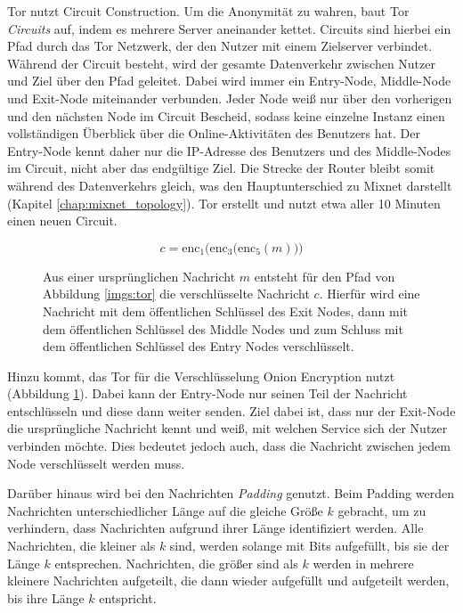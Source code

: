 Tor nutzt Circuit Construction. Um die Anonymität zu wahren, baut Tor \textit{Circuits} auf, indem es mehrere Server aneinander kettet. Circuits sind hierbei ein Pfad durch das Tor Netzwerk, der den Nutzer mit einem Zielserver verbindet. Während der Circuit besteht, wird der gesamte Datenverkehr zwischen Nutzer und Ziel über den Pfad geleitet. Dabei wird immer ein Entry-Node, Middle-Node und Exit-Node miteinander verbunden. Jeder Node weiß nur über den vorherigen und den nächsten Node im Circuit Bescheid, sodass keine einzelne Instanz einen vollständigen Überblick über die Online-Aktivitäten des Benutzers hat. Der Entry-Node kennt daher nur die IP-Adresse des Benutzers und des Middle-Nodes im Circuit, nicht aber das endgültige Ziel. Die Strecke der Router bleibt somit während des Datenverkehrs gleich, was den Hauptunterschied zu Mixnet darstellt (Kapitel \ref{chap:mixnet_topology}). Tor erstellt und nutzt etwa aller 10 Minuten einen neuen Circuit.

\begin{figure}[!h]
    \begin{displaymath}
        c = \mathrm{enc}_{1}\Big(\mathrm{enc}_{3}\big(\mathrm{enc}_{5}(m)\big)\Big)
    \end{displaymath}
    \caption{Aus einer ursprünglichen Nachricht $m$ entsteht für den Pfad von Abbildung \ref{imgs:tor} die verschlüsselte Nachricht $c$. Hierfür wird eine Nachricht mit dem öffentlichen Schlüssel des Exit Nodes, dann mit dem öffentlichen Schlüssel des Middle Nodes und zum Schluss mit dem öffentlichen Schlüssel des Entry Nodes verschlüsselt.}
    \label{equa:encryption}
\end{figure}

Hinzu kommt, das Tor für die Verschlüsselung Onion Encryption nutzt (Abbildung \ref{equa:encryption}). Dabei kann der Entry-Node nur seinen Teil der Nachricht entschlüsseln und diese dann weiter senden. Ziel dabei ist, dass nur der Exit-Node die ursprüngliche Nachricht kennt und weiß, mit welchen Service sich der Nutzer verbinden möchte. Dies bedeutet jedoch auch, dass die Nachricht zwischen jedem Node verschlüsselt werden muss\cite{OnionRoutingApproaches}.

Darüber hinaus wird bei den Nachrichten \textit{Padding} genutzt. Beim Padding werden Nachrichten unterschiedlicher Länge auf die gleiche Größe $k$ gebracht, um zu verhindern, dass Nachrichten aufgrund ihrer Länge identifiziert werden. Alle Nachrichten, die kleiner als $k$ sind, werden solange mit Bits aufgefüllt, bis sie der Länge $k$ entsprechen. Nachrichten, die größer sind als $k$ werden in mehrere kleinere Nachrichten aufgeteilt, die dann wieder aufgefüllt und aufgeteilt werden, bis ihre Länge $k$ entspricht\cite{TorPadding}.

